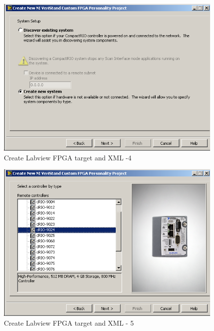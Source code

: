 \documentclass[a4paper,twoside,english]{report}
\begin{document}
\begin{figure}[!h]
\centering \includegraphics[scale=0.45]{Screenshots/Screenshot_2015-01-16_19-23-58.png}
\caption{Create Labview FPGA target and XML -4}

\label{fig: Create Labview FPGA target and XML-4} 
\end{figure}

\begin{figure}[!h]
\centering \includegraphics[scale=0.45]{Screenshots/Screenshot_2015-01-16_19-24-31.png}
\caption{Create Labview FPGA target and XML - 5}

\label{fig: Create Labview FPGA target and XML-5} 
\end{figure}
\end{document}
